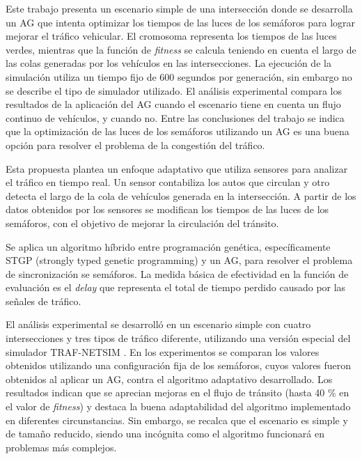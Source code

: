 \begin{itemize}
\begin{item}
Este trabajo presenta un escenario simple de una intersección donde se desarrolla un AG que intenta optimizar los tiempos de las luces de los semáforos para lograr mejorar el tráfico vehicular. El cromosoma representa los tiempos de las luces verdes, mientras que la función de \emph{fitness} se calcula teniendo en cuenta el largo de las colas generadas por los vehículos en las intersecciones. La ejecución de la simulación utiliza un tiempo fijo de 600 segundos por generación, sin embargo no se describe el tipo de simulador utilizado. El análisis experimental compara los resultados de la aplicación del AG cuando el escenario tiene en cuenta un flujo continuo de vehículos, y cuando no. Entre las conclusiones del trabajo se indica que la optimización de las luces de los semáforos utilizando un AG es una buena opción para resolver el problema de la congestión del tráfico.	
\end{item}	


\begin{item}

Esta propuesta plantea un enfoque adaptativo que utiliza sensores para analizar el tráfico en tiempo real. Un sensor contabiliza los autos que circulan y otro detecta el largo de la cola de vehículos generada en la intersección. A partir de los datos obtenidos por los sensores se modifican los tiempos de las luces de los semáforos, con el objetivo de mejorar la circulación del tránsito. 

Se aplica un algoritmo híbrido entre programación genética, específicamente STGP (strongly typed genetic programming) \citep{Montana1995} y un AG, para resolver el problema de sincronización se semáforos. La medida básica de efectividad en la función de evaluación es el \emph{delay} que representa el total de tiempo perdido causado por las señales de tráfico. 

El análisis experimental se desarrolló en un escenario simple con cuatro intersecciones y tres tipos de tráfico diferente, utilizando una versión especial del simulador TRAF-NETSIM \citep{TRAF-NETSIM}. En los experimentos se comparan los valores obtenidos utilizando una configuración fija de los semáforos, cuyos valores fueron obtenidos al aplicar un AG, contra el algoritmo adaptativo desarrollado. Los resultados indican que se aprecian mejoras en el flujo de tránsito (hasta 40 \% en el valor de \emph{fitness})  y destaca la buena adaptabilidad del algoritmo implementado en diferentes circunstancias. Sin embargo, se recalca que el escenario es simple y de tamaño reducido, siendo una incógnita como el algoritmo funcionará en problemas más complejos.


\end{item}
\end{itemize}
